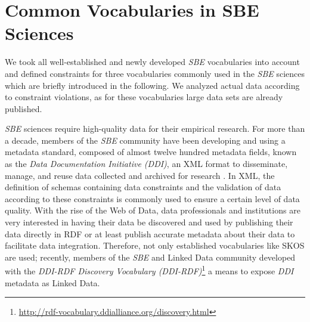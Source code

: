 \documentclass[conference]{IEEEtran}
\begin{document}
\section{Common Vocabularies in SBE Sciences}
\label{rdf-representation}

We took all well-established and newly developed \emph{SBE} vocabularies into account and defined constraints for three vocabularies commonly used in the \emph{SBE} sciences which are briefly introduced in the following. We analyzed actual data according to constraint violations, as for these vocabularies large data sets are already published.

\emph{SBE} sciences require high-quality data for their empirical research. For more than a decade, members of the \emph{SBE} community have been developing and using a
metadata standard, composed of almost twelve hundred metadata fields, known as the \emph{Data Documentation Initiative (DDI)},
an XML format to disseminate, manage,
and reuse data collected and archived for research \cite{Vardigan2008}. 
In XML, the definition of schemas containing data constraints and the validation of data according to these constraints is commonly used to ensure a certain level of data quality.
With the rise of the Web of Data, data professionals and institutions are very interested in having their data be discovered and used by publishing their data directly in RDF or at least publish accurate metadata about their data to facilitate data integration. Therefore, not only established vocabularies like SKOS are used; 
recently, members of the \emph{SBE} and Linked Data community developed with the \emph{DDI-RDF Discovery Vocabulary (DDI-RDF)}\footnote{\url{http://rdf-vocabulary.ddialliance.org/discovery.html}} a means to expose \emph{DDI} metadata as Linked Data. 
\end{document}
